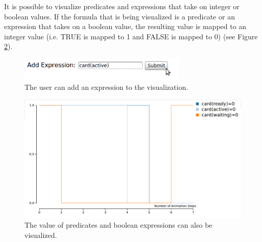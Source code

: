 It is possible to visualize predicates and expressions that take on integer or boolean values. If the formula that is being visualized is a predicate or an expression that takes on a boolean value, the resulting value is mapped to an integer value (i.e. TRUE is mapped to 1 and FALSE is mapped to 0) (see Figure \ref{valueBool}).

\begin{center}
\begin{figure}[h!]
\centering
\includegraphics[width=8cm]{bilder/timeVValueUI.png}
\caption{The user can add an expression to the visualization.}
\label{timeVsValueUI}
\end{figure}
\end{center}

\begin{center}
\begin{figure}[h!]
\centering
\includegraphics[width=14cm]{bilder/valueBool.png}
\caption{The value of predicates and boolean expressions can also be visualized.}
\label{valueBool}
\end{figure}
\end{center}